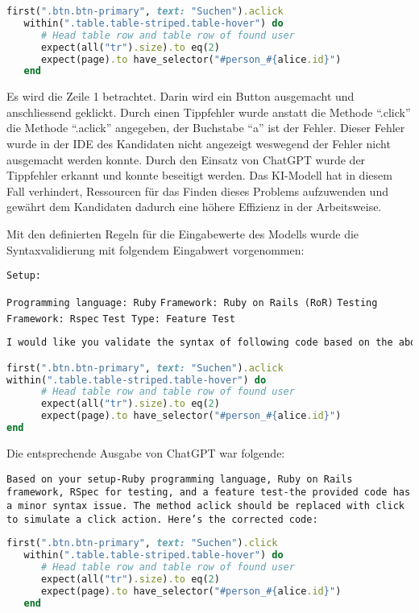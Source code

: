 \begin{lstlisting}[language=Ruby]
   first(".btn.btn-primary", text: "Suchen").aclick
   within(".table.table-striped.table-hover") do
      # Head table row and table row of found user
      expect(all("tr").size).to eq(2)
      expect(page).to have_selector("#person_#{alice.id}")
   end
\end{lstlisting}

Es wird die Zeile 1 betrachtet. Darin wird ein Button ausgemacht und anschliessend geklickt. Durch einen Tippfehler
wurde anstatt die Methode ``.click'' die Methode ``.aclick'' angegeben, der Buchstabe ``a'' ist der Fehler. 
Dieser Fehler wurde in der IDE des Kandidaten nicht angezeigt weswegend der Fehler nicht ausgemacht werden konnte.
Durch den Einsatz von ChatGPT wurde der Tippfehler erkannt und konnte beseitigt werden. Das KI-Modell hat in diesem Fall verhindert,
Ressourcen für das Finden dieses Problems aufzuwenden und gewährt dem Kandidaten dadurch eine höhere Effizienz in der Arbeitsweise.

Mit den definierten Regeln für die Eingabewerte des Modells wurde die Syntaxvalidierung mit folgendem Eingabwert vorgenommen:

\texttt{Setup:}

\texttt{Programming language: Ruby}
\texttt{Framework: Ruby on Rails (RoR)}
\texttt{Testing Framework: Rspec}
\texttt{Test Type: Feature Test}
\newline

\begin{lstlisting}[language=Ruby]
I would like you validate the syntax of following code based on the above setup:

first(".btn.btn-primary", text: "Suchen").aclick
within(".table.table-striped.table-hover") do
      # Head table row and table row of found user
      expect(all("tr").size).to eq(2)
      expect(page).to have_selector("#person_#{alice.id}")
end
\end{lstlisting}

Die entsprechende Ausgabe von ChatGPT war folgende:
\newline

\texttt{Based on your setup-Ruby programming language, Ruby on Rails framework, RSpec for testing, and a feature test-the provided code has a minor syntax issue. The method aclick should be replaced with click to simulate a click action. 
Here's the corrected code:}
\newline

\begin{lstlisting}[language=Ruby]
   first(".btn.btn-primary", text: "Suchen").click
   within(".table.table-striped.table-hover") do
      # Head table row and table row of found user
      expect(all("tr").size).to eq(2)
      expect(page).to have_selector("#person_#{alice.id}")
   end
\end{lstlisting}


